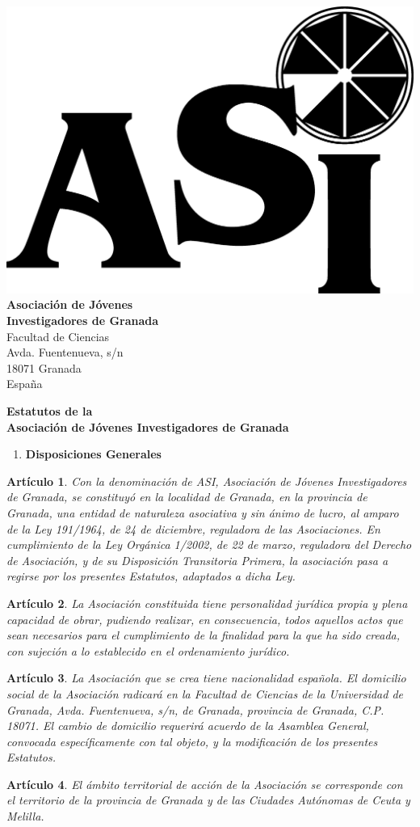 \documentclass[a4paper,12pt]{article}
\theoremstyle{mystyle}		%
\newtheorem{art}{Artículo}	%
\def\membrete{
\hfill\parbox{8cm}{\raggedright
\begin{center}
\vspace{-10mm}
\footnotesize\sf
\includegraphics[scale=0.2]{LogoASI-Granada}\\
{\bf Asociación de Jóvenes\\
Investigadores de Granada}\\
Facultad de Ciencias\\
Avda. Fuentenueva, s/n\\
18071 Granada\\
España
\vspace{10pt}
\end{center}}}
\begin{document}
\begin{onehalfspace}

\membrete

\begin{center}
\Large{\bf Estatutos de la\\ Asociación de Jóvenes Investigadores de Granada}
\end{center}

\bigskip

\begin{enumerate}[label={\bf CAPÍTULO \Roman*.}, align=left, series=capitulo]\centering
 \item \textbf{Disposiciones Generales}
\end{enumerate}

\begin{art}
Con la denominación de ASI, Asociación de Jóvenes Investigadores de Granada, se constituyó en la localidad de Granada, en la provincia de Granada, una entidad de naturaleza asociativa y sin ánimo de lucro, al amparo de la Ley 191/1964, de 24 de diciembre, reguladora de las Asociaciones. En cumplimiento de la Ley Orgánica 1/2002, de 22 de marzo, reguladora del Derecho de Asociación, y de su Disposición Transitoria Primera, la asociación pasa a regirse por los presentes Estatutos, adaptados a dicha Ley.
\end{art}

\begin{art}
La Asociación constituida tiene personalidad jurídica propia y plena capacidad de obrar, pudiendo realizar, en consecuencia, todos aquellos actos que sean necesarios para el cumplimiento de la finalidad para la que ha sido creada, con sujeción a lo establecido en el ordenamiento jurídico.
\end{art}

\begin{art}
La Asociación que se crea tiene nacionalidad española. El domicilio social de la Asociación radicará en la Facultad de Ciencias de la Universidad de Granada, Avda. Fuentenueva, s/n, de Granada, provincia de Granada, C.P. 18071. El cambio de domicilio requerirá acuerdo de la Asamblea General, convocada específicamente con tal objeto, y la modificación de los presentes Estatutos.
\end{art}

\begin{art}
El ámbito territorial de acción de la Asociación se corresponde con el territorio de la provincia de Granada y de las Ciudades Autónomas de Ceuta y Melilla.
\end{art}


\end{onehalfspace}
\end{document}
